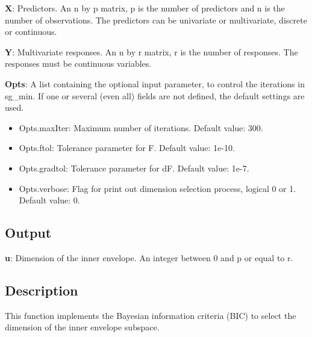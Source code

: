\documentclass[a4paper,11pt,openany]{memoir}
\begin{document}
\begin{par}
\textbf{X}: Predictors. An n by p matrix, p is the number of predictors and n is the number of observations. The predictors can be univariate or multivariate, discrete or continuous.
\end{par} \vspace{1em}
\begin{par}
\textbf{Y}: Multivariate responses. An n by r matrix, r is the number of responses. The responses must be continuous variables.
\end{par} \vspace{1em}
\begin{par}
\textbf{Opts}: A list containing the optional input parameter, to control the iterations in sg\_min. If one or several (even all) fields are not defined, the default settings are used.
\end{par} \vspace{1em}
\begin{itemize}
\setlength{\itemsep}{-1ex}
   \item Opts.maxIter: Maximum number of iterations.  Default value: 300.
   \item Opts.ftol: Tolerance parameter for F.  Default value: 1e-10.
   \item Opts.gradtol: Tolerance parameter for dF.  Default value: 1e-7.
   \item Opts.verbose: Flag for print out dimension selection process, logical 0 or 1. Default value: 0.
\end{itemize}


\subsection*{Output}

\begin{par}
\textbf{u}: Dimension of the inner envelope. An integer between 0 and p or equal to r.
\end{par} \vspace{1em}


\subsection*{Description}

\begin{par}
This function implements the Bayesian information criteria (BIC) to select the dimension of the inner envelope subspace.
\end{par} \vspace{1em}
\end{document}
